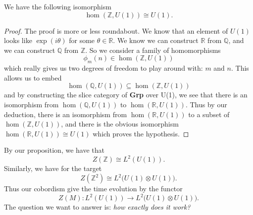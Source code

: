 \documentclass[draft]{amsart}
\numberwithin{equation}{section}
\begin{document}
\begin{prop}%
We have the following isomorphism
\begin{equation}%
\hom(\mathbb{Z},U(1))\cong U(1).
\end{equation}
\end{prop}
\begin{proof}
The proof is more or less roundabout. We know that an element of
$U(1)$ looks like $\exp(i\theta)$ for some
$\theta\in\mathbb{R}$. We know we can construct $\mathbb{R}$ from
$\mathbb{Q}$, and we can construct $\mathbb{Q}$ from
$\mathbb{Z}$. So we consider a family of homomorphisms
\begin{equation}%
\phi_{m}(n)\in\hom(\mathbb{Z},U(1))
\end{equation}
which really gives us two degrees of freedom to play around with:
$m$ and $n$. This allows us to embed 
\begin{equation}%
\hom(\mathbb{Q},U(1))\subseteq\hom(\mathbb{Z},U(1))
\end{equation}
and by constructing the slice category of \textbf{Grp} over U(1),
we see that there is an isomorphism from $\hom(\mathbb{Q},U(1))$
to $\hom(\mathbb{R},U(1))$. Thus by our deduction, there is an
isomorphism from $\hom(\mathbb{R},U(1))$ to a subset of
$\hom(\mathbb{Z},U(1))$, and there is the obvious isomorphism
$\hom(\mathbb{R},U(1))\cong U(1)$ which proves the hypothesis.
\end{proof}

By our proposition, we have that
\begin{equation}%
Z(\mathbb{Z})\cong L^{2}(U(1)).
\end{equation}
Similarly, we have for the target
\begin{equation}%
Z(\mathbb{Z}^{2})\cong L^{2}\Big(U(1)\otimes U(1)\Big).
\end{equation}
Thus our cobordism give the time evolution by the functor
\begin{equation}%
Z(M): L^{2}(U(1))\to L^{2}\Big(U(1)\otimes U(1)\Big).
\end{equation}
The question we want to answer is: \emph{how exactly does it work?}

\nocite{*}


\end{document}
